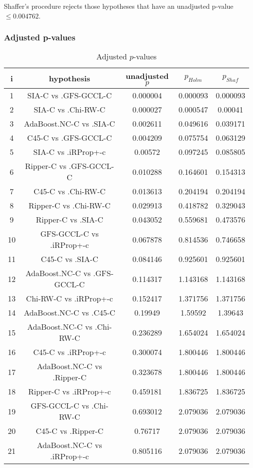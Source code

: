 \documentclass[a4paper,10pt]{article}
\begin{document}
Shaffer's procedure rejects those hypotheses that have an unadjusted p-value $\le0.004762$.

\pagebreak

\subsubsection{Adjusted p-values}

\begin{table}[!htp]
\centering\scriptsize
\begin{tabular}{ccccc}
i&hypothesis&unadjusted $p$&$p_{Holm}$&$p_{Shaf}$\\
\hline1&SIA-C vs .GFS-GCCL-C&0.000004&0.000093&0.000093\\
2&SIA-C vs .Chi-RW-C&0.000027&0.000547&0.00041\\
3&AdaBoost.NC-C vs .SIA-C&0.002611&0.049616&0.039171\\
4&C45-C vs .GFS-GCCL-C&0.004209&0.075754&0.063129\\
5&SIA-C vs .iRProp+-c&0.00572&0.097245&0.085805\\
6&Ripper-C vs .GFS-GCCL-C&0.010288&0.164601&0.154313\\
7&C45-C vs .Chi-RW-C&0.013613&0.204194&0.204194\\
8&Ripper-C vs .Chi-RW-C&0.029913&0.418782&0.329043\\
9&Ripper-C vs .SIA-C&0.043052&0.559681&0.473576\\
10&GFS-GCCL-C vs .iRProp+-c&0.067878&0.814536&0.746658\\
11&C45-C vs .SIA-C&0.084146&0.925601&0.925601\\
12&AdaBoost.NC-C vs .GFS-GCCL-C&0.114317&1.143168&1.143168\\
13&Chi-RW-C vs .iRProp+-c&0.152417&1.371756&1.371756\\
14&AdaBoost.NC-C vs .C45-C&0.19949&1.59592&1.39643\\
15&AdaBoost.NC-C vs .Chi-RW-C&0.236289&1.654024&1.654024\\
16&C45-C vs .iRProp+-c&0.300074&1.800446&1.800446\\
17&AdaBoost.NC-C vs .Ripper-C&0.323678&1.800446&1.800446\\
18&Ripper-C vs .iRProp+-c&0.459181&1.836725&1.836725\\
19&GFS-GCCL-C vs .Chi-RW-C&0.693012&2.079036&2.079036\\
20&C45-C vs .Ripper-C&0.76717&2.079036&2.079036\\
21&AdaBoost.NC-C vs .iRProp+-c&0.805116&2.079036&2.079036\\
\hline
\end{tabular}
\caption{Adjusted $p$-values}
\end{table}
\end{document}
